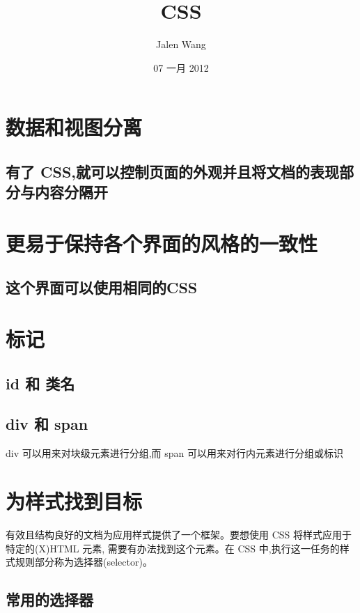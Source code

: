 \documentclass[11pt]{article}
\title{CSS}
\author{Jalen Wang}
\date{07 一月 2012}
\begin{document}
\maketitle

\setcounter{tocdepth}{3}
\tableofcontents
\vspace*{1cm}

\section{数据和视图分离}
\label{sec-1}

\subsection{有了 CSS,就可以控制页面的外观并且将文档的表现部分与内容分隔开}
\label{sec-1.1}

\section{更易于保持各个界面的风格的一致性}
\label{sec-2}

\subsection{这个界面可以使用相同的CSS}
\label{sec-2.1}

\section{标记}
\label{sec-3}

\subsection{id 和 类名}
\label{sec-3.1}

\subsection{div 和 span}
\label{sec-3.2}

   div 可以用来对块级元素进行分组,而 span 可以用来对行内元素进行分组或标识
\section{为样式找到目标}
\label{sec-4}

  有效且结构良好的文档为应用样式提供了一个框架。要想使用 CSS 将样式应用于特定的(X)HTML 元素,
需要有办法找到这个元素。在 CSS 中,执行这一任务的样式规则部分称为选择器(selector)。
\subsection{常用的选择器}
\label{sec-4.1}
\end{document}
